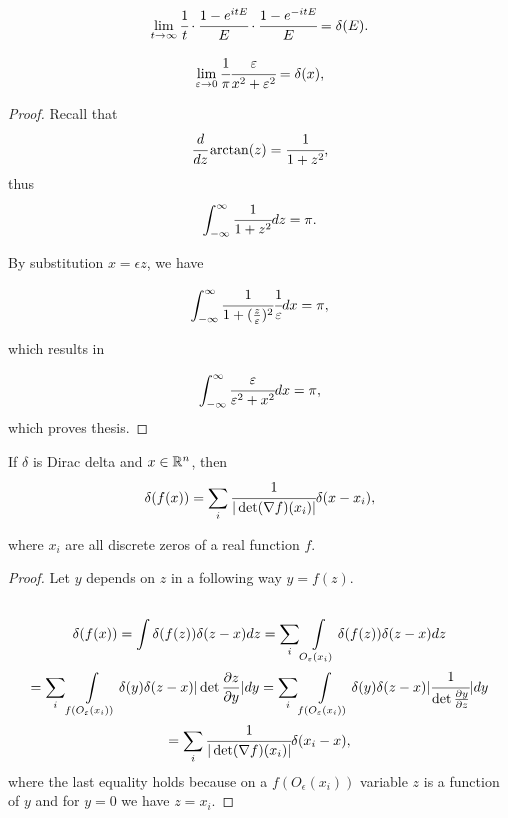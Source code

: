 \documentclass[main.tex]{subfiles}
\begin{document}
\begin{corollary}
\begin{equation}
\lim_{t\to\infty} \cfrac{1}{t} \cdot  \cfrac{1 - e^{itE}}{E}\cdot \cfrac{1 - e^{-itE}}{E} = \delta(E).
\end{equation}
\end{corollary}

\begin{fact}
\begin{equation}
\lim_{\epsilon\to 0} \cfrac{1}{\pi}\cfrac{\epsilon}{x^2 + \epsilon^2} = \delta(x),
\end{equation}

\end{fact}
\begin{proof}
Recall that
\begin{equation}
\cfrac{d}{dz}\arctan(z) = \cfrac{1}{1 + z^2},
\end{equation}
thus
\begin{equation}
\int_{-\infty}^\infty \cfrac{1}{1 + z^2} dz = \pi.
\end{equation}

By substitution $x = \epsilon z$, we have

\begin{equation}
\int_{-\infty}^\infty \cfrac{1}{1 + (\frac{z}{\epsilon})^2} \cfrac{1}{\epsilon} dx = \pi,
\end{equation}

which results in 

\begin{equation}
\int_{-\infty}^\infty \cfrac{\epsilon}{\epsilon^2 + x^2} dx = \pi,
\end{equation}
which proves thesis.

\end{proof}

\begin{fact}
\label{delta-zeros}
If $\delta$ is Dirac delta and $x\in \R^n$, then
\begin{equation}
\delta(f(x)) = \sum_i \cfrac{1}{|\det (\nabla f)(x_i)|}\delta(x-x_i),
\end{equation}

where $x_i$ are all discrete zeros of a real function $f$.
\end{fact}

\begin{proof}
Let $y$ depends on $z$ in a following way $y = f(z)$.
\begin{multline*}
\\
\delta(f(x)) = \int \delta(f(z))\delta(z - x) dz = \sum_i \int\limits_{O_\epsilon(x_i)}
\delta(f(z))\delta(z - x) dz \\
= \sum_i \int\limits_{f(O_\epsilon(x_i))}
\delta(y)\delta(z - x) |\det \frac{\partial z}{\partial y}| dy = \sum_i \int\limits_{f(O_\epsilon(x_i))}
\delta(y)\delta(z - x) |\cfrac{1}{\det \frac{\partial y}{\partial z}}| dy
\\ =   \sum_i \cfrac{1}{|\det (\nabla f)(x_i)|}\delta(x_i-x),
\\
\end{multline*}
where the last equality holds because on a $f(O_\epsilon(x_i))$ variable $z$ is a function of $y$ and for $y=0$ we have $z = x_i$. 
\end{proof}
\end{document}
